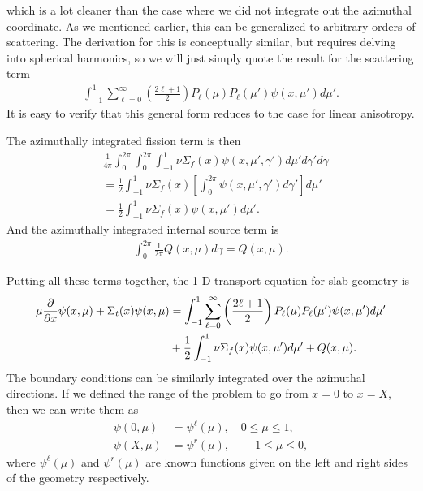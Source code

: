 which is a lot cleaner than the case where we did not integrate out the azimuthal coordinate. As we mentioned earlier, this can be generalized to arbitrary orders of scattering. The derivation for this is conceptually similar, but requires delving into spherical harmonics, so we will just simply quote the result for the scattering term
\begin{align}
  \int_{-1}^1 \sum_{\ell = 0}^\infty \left( \frac{2\ell + 1}{2} \right) P_\ell(\mu) P_\ell(\mu') \psi(x,\mu') d\mu'. \nonumber
\end{align}
It is easy to verify that this general form reduces to the case for linear anisotropy.

The azimuthally integrated fission term is then
\begin{align}
  &\frac{1}{4\pi} \int_0^{2\pi} \int_0^{2\pi} \int_{-1}^1 \nu \Sigma_f(x)  \psi(x,\mu',\gamma') d\mu' d\gamma' d\gamma \nonumber \\
  &= \frac{1}{2}  \int_{-1}^1 \nu \Sigma_f(x) \left[ \int_0^{2\pi} \psi(x,\mu',\gamma') d\gamma' \right] d\mu' \nonumber \\
  &= \frac{1}{2}  \int_{-1}^1 \nu \Sigma_f(x) \psi(x,\mu') d\mu' . \nonumber
\end{align}
And the azimuthally integrated internal source term is
\begin{align}
  \int_0^{2\pi} \frac{1}{2\pi} Q(x,\mu) d\gamma = Q(x,\mu) . \nonumber
\end{align}

Putting all these terms together, the 1-D transport equation for slab geometry is 
\begin{align}
   \mu \frac{ \partial {} }{ \partial {x} } \psi(x,\mu) + \Sigma_t(x) \psi(x,\mu) 
   &= \int_{-1}^1 \sum_{\ell = 0}^\infty \left( \frac{2\ell + 1}{2} \right) P_\ell(\mu) P_\ell(\mu') \psi(x,\mu') d\mu' \nonumber \\
   &+ \frac{1}{2}  \int_{-1}^1 \nu \Sigma_f(x) \psi(x,\mu') d\mu' + Q(x,\mu) .
\end{align} 
The boundary conditions can be similarly integrated over the azimuthal directions. If we defined the range of the problem to go from $x = 0$ to $x = X$, then we can write them as
\begin{subequations}
\begin{align}
  \psi(0,\mu) &= \psi^\ell(\mu), \quad 0 \le \mu \le 1, \\
  \psi(X,\mu) &= \psi^r(\mu), \quad -1 \le \mu \le 0,
\end{align}
\end{subequations}
where $\psi^\ell(\mu)$ and $\psi^r(\mu)$ are known functions given on the left and right sides of the geometry respectively.

